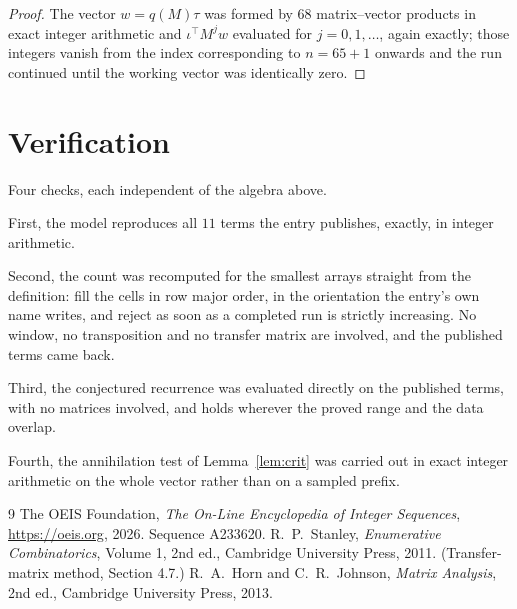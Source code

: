 \documentclass[11pt,a4paper]{article}
\theoremstyle{plain}
\theoremstyle{definition}
\begin{document}
\begin{proof}
The vector $w=q(M)\tau$ was formed by $68$ matrix--vector products in exact integer
arithmetic and $\iota^{\!\top}M^{j}w$ evaluated for $j=0,1,\dots$, again exactly; those
integers vanish from the index corresponding to $n=65+1$ onwards and the run continued
until the working vector was identically zero.
\end{proof}

\section{Verification}

Four checks, each independent of the algebra above.

First, the model reproduces all $11$ terms the entry publishes, exactly, in integer
arithmetic.

Second, the count was recomputed for the smallest arrays straight from the definition: fill the
cells in row major order, in the orientation the entry's own name writes, and reject as soon as
a completed run is strictly increasing. No window, no transposition and no transfer matrix are involved, and
the published terms came back.

Third, the conjectured recurrence was evaluated directly on the published terms, with no
matrices involved, and holds wherever the proved range and the data overlap.

Fourth, the annihilation test of Lemma~\ref{lem:crit} was carried out in exact integer
arithmetic on the whole vector rather than on a sampled prefix.

\begin{thebibliography}{9}
 The OEIS Foundation, \emph{The On-Line Encyclopedia of Integer
Sequences}, \url{https://oeis.org}, 2026. Sequence A233620.
 R.~P.~Stanley, \emph{Enumerative Combinatorics}, Volume 1, 2nd ed.,
Cambridge University Press, 2011. (Transfer-matrix method, Section 4.7.)
 R.~A.~Horn and C.~R.~Johnson, \emph{Matrix Analysis}, 2nd ed., Cambridge
University Press, 2013.
\end{thebibliography}
\end{document}
